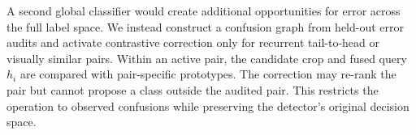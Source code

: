 A second global classifier would create additional opportunities for error across the full label space. We instead construct a confusion graph from held-out error audits and activate contrastive correction only for recurrent tail-to-head or visually similar pairs. Within an active pair, the candidate crop and fused query $h_i$ are compared with pair-specific prototypes. The correction may re-rank the pair but cannot propose a class outside the audited pair. This restricts the operation to observed confusions while preserving the detector's original decision space.
